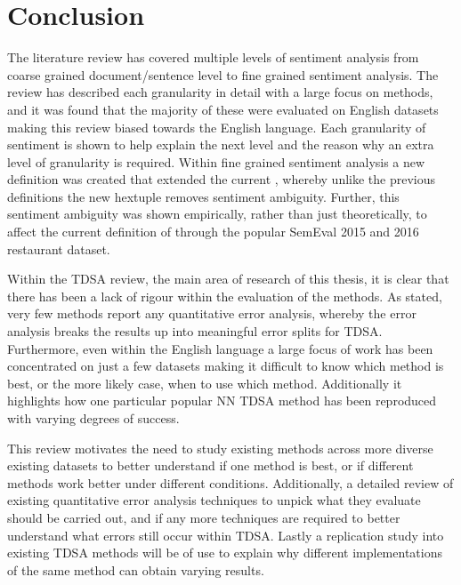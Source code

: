 \section{Conclusion}
The literature review has covered multiple levels of sentiment analysis from coarse grained document/sentence level to fine grained sentiment analysis. The review has described each granularity in detail with a large focus on methods, and it was found that the majority of these were evaluated on English datasets making this review biased towards the English language. Each granularity of sentiment is shown to help explain the next level and the reason why an extra level of granularity is required. Within fine grained sentiment analysis a new definition was created that extended the current \citep{liu2015sentiment}, whereby unlike the previous definitions the new hextuple removes sentiment ambiguity. Further, this sentiment ambiguity was shown empirically, rather than just theoretically, to affect the current definition of \citet{liu2015sentiment} through the popular SemEval 2015 \citep{pontiki-etal-2015-semeval} and 2016 \citep{pontiki-etal-2016-semeval} restaurant dataset. 

Within the TDSA review, the main area of research of this thesis, it is clear that there has been a lack of rigour within the evaluation of the methods. As stated, very few methods report any quantitative error analysis, whereby the error analysis breaks the results up into meaningful error splits for TDSA. Furthermore, even within the English language a large focus of work has been concentrated on just a few datasets making it difficult to know which method is best, or the more likely case, when to use which method. Additionally it highlights how one particular popular NN TDSA method \citep{tang-etal-2016-effective} has been reproduced with varying degrees of success.

This review motivates the need to study existing methods across more diverse existing datasets to better understand if one method is best, or if different methods work better under different conditions. Additionally, a detailed review of existing quantitative error analysis techniques to unpick what they evaluate should be carried out, and if any more techniques are required to better understand what errors still occur within TDSA. Lastly a replication study into existing TDSA methods will be of use to explain why different implementations of the same method can obtain varying results. 

